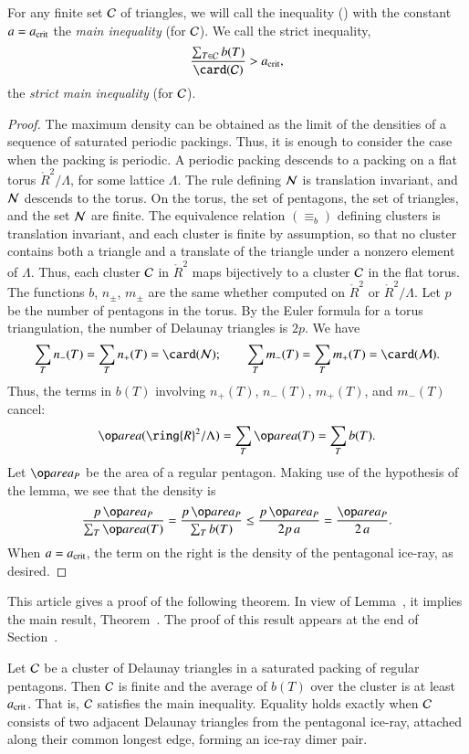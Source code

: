 For any finite set $\mathcal C$ of triangles, we will call the inequality
() with the constant $a=a_\text{crit}$ the {\it main inequality}
(for $\mathcal C$).  We call the strict inequality,
\begin{equation}\libel{eqn:strict-main}
\frac{\sum_{T\in \C} b(T)}{\card(\C)} > \acrit,
\end{equation}
the {\it strict main inequality} (for $\mathcal C$).


\begin{proof} The maximum density can be obtained as the limit of the
  densities of a sequence of saturated periodic packings.  Thus, it is
  enough to consider the case when the packing is periodic.  A
  periodic packing descends to a packing on a flat torus
  $\ring{R}^2/\Lambda$, for some lattice $\Lambda$.  The rule defining
  $\mathcal N$ is translation invariant, and $\mathcal N$ descends to the torus.  On
  the torus, the set of pentagons, the set of triangles, and the set
  $\mathcal N$ are finite.  The equivalence relation $(\equiv_b)$ defining
  clusters is translation invariant, and each cluster is finite by
  assumption, so that no cluster contains both a triangle and a
  translate of the triangle under a nonzero element of $\Lambda$.
  Thus, each cluster $\mathcal C$ in $\ring{R}^2$ maps bijectively to a
  cluster $\mathcal C$ in the flat torus.  The functions $b$, $n_\pm$, $m_\pm$
  are the same whether computed on $\ring{R}^2$ or
  $\ring{R}^2/\Lambda$.  Let $p$ be the number of pentagons in the
  torus.  By the Euler formula for a torus triangulation, the number
  of Delaunay triangles is $2p$.  We have
\[
\sum_{T} n_-(T) =  \sum_{T} n_+(T) = \card(\N);\qquad
\sum_{T} m_-(T) =  \sum_{T} m_+(T) = \card(\M).
\]
Thus, the terms in $b(T)$ involving $n_+(T)$, $n_-(T)$, $m_+(T)$,
and $m_-(T)$ cancel:
\[
\area(\ring{R}^2/\Lambda) = \sum_T \area(T) = \sum_T b(T).
\]    
Let $\area_P$ be the area of a regular pentagon.  Making use of the
hypothesis of the lemma, we see that the density is
\[
\frac{p\, \area_P}{\sum_T \area(T)} 
=\frac{p\, \area_P}{\sum_T b(T)} \le\frac{p\, \area_P}{2 p\, a} 
= \frac{\area_P}{2\, a}.
\]
When $a=a_\text{crit}$, the term on the right is the density of the
pentagonal ice-ray, as desired.
\end{proof}

This article gives a proof of the following theorem. In view of
Lemma~, it implies the main result,
Theorem~.  The proof of this result appears at the end
of Section~.

\begin{theorem}
  Let $\mathcal C$ be a cluster of Delaunay triangles in a saturated packing
  of regular pentagons.  Then $\mathcal C$ is finite and the average of $b(T)$
  over the cluster is at least $a_\text{crit}$.  That is, $\mathcal C$ satisfies the
  main inequality.  Equality holds exactly when $\mathcal C$ consists of two
  adjacent Delaunay triangles from the pentagonal ice-ray, attached
  along their common longest edge, forming an ice-ray dimer pair.
\end{theorem}

